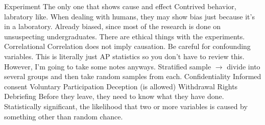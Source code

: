 \markdownRendererUlEndTight \markdownRendererUlItemEnd 
\markdownRendererUlItem Experiment\markdownRendererInterblockSeparator
{}\markdownRendererUlBeginTight
\markdownRendererUlItem The only one that shows cause and effect\markdownRendererUlItemEnd 
\markdownRendererUlItem Contrived behavior, labratory like.\markdownRendererUlItemEnd 
\markdownRendererUlItem When dealing with humans, they may show bias just because it's in a laboratory.\markdownRendererUlItemEnd 
\markdownRendererUlItem Already biased, since most of the research is done on unsuspecting undergraduates.\markdownRendererUlItemEnd 
\markdownRendererUlItem There are ethical things with the experiments.\markdownRendererUlItemEnd 
\markdownRendererUlEndTight \markdownRendererUlItemEnd 
\markdownRendererUlItem Correlational\markdownRendererInterblockSeparator
{}\markdownRendererUlBeginTight
\markdownRendererUlItem Correlation does not imply causation.\markdownRendererUlItemEnd 
\markdownRendererUlItem Be careful for confounding variables.\markdownRendererUlItemEnd 
\markdownRendererUlEndTight \markdownRendererUlItemEnd 
\markdownRendererUlEndTight \markdownRendererInterblockSeparator
{}\markdownRendererInterblockSeparator
{}This is literally just AP statistics so you don't have to review this. However, I'm going to take some notes anyways.\markdownRendererInterblockSeparator
{}\markdownRendererUlBeginTight
\markdownRendererUlItem Stratified sample $\rightarrow$ divide into several groups and then take random samples from each.\markdownRendererUlItemEnd 
\markdownRendererUlEndTight \markdownRendererInterblockSeparator
{}\markdownRendererInterblockSeparator
{}\markdownRendererUlBegin
\markdownRendererUlItem Confidentiality\markdownRendererUlItemEnd 
\markdownRendererUlItem Informed consent\markdownRendererUlItemEnd 
\markdownRendererUlItem Voluntary Participation\markdownRendererUlItemEnd 
\markdownRendererUlItem Deception (is allowed)\markdownRendererUlItemEnd 
\markdownRendererUlItem Withdrawal Rights\markdownRendererUlItemEnd 
\markdownRendererUlItem Debriefing\markdownRendererInterblockSeparator
{}\markdownRendererUlBeginTight
\markdownRendererUlItem Before they leave, they need to know what they have done.\markdownRendererUlItemEnd 
\markdownRendererUlEndTight \markdownRendererUlItemEnd 
\markdownRendererUlItem Statistically significant, the likelihood that two or more variables is caused by something other than random chance.\markdownRendererUlItemEnd 
\markdownRendererUlEnd \markdownRendererInterblockSeparator
{}\markdownRendererInterblockSeparator
